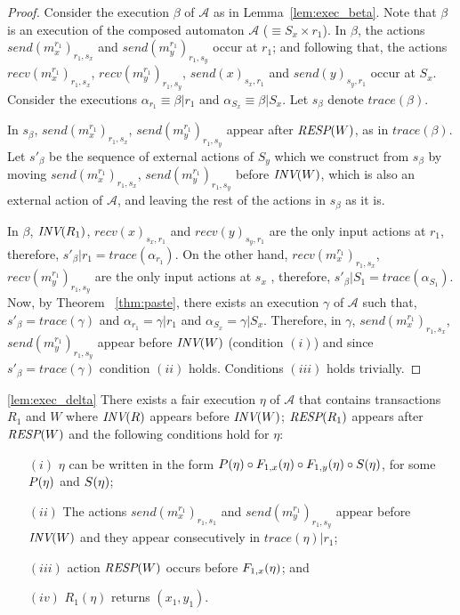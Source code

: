 \begin{proof}
Consider the execution $\beta$ of $\mathcal{A}$  as in Lemma~\ref{lem:exec_beta}. Note that $\beta$
is an execution of the composed automaton $\mathcal{A}$ ($\equiv S_x \times r_1$).  In $\beta$,  the actions 
 $send(m_x^{r_1})_{r_1, s_x}$ and   $send(m_y^{r_1})_{r_1, s_y}$ occur at $r_1$; and following that,  the actions 
 $recv(m_x^{r_1})_{r_1, s_x}$, $recv(m_y^{r_1})_{r_1, s_y}$, $send(x)_{s_x, r_1}$ and  $send(y)_{s_y, r_1}$ occur at $S_x$. 
 Consider the executions $\alpha_{r_1} \equiv \beta|r_1$ and  $\alpha_{S_x} \equiv \beta|S_x$. Let $s_{\beta}$ denote  $trace(\beta)$.
 
 In $s_{\beta}$, $send(m_x^{r_1})_{r_1, s_x}$,  $send(m_y^{r_1})_{r_1, s_y}$ appear after ${\textit{RESP}(W)}$, as in $trace(\beta)$. Let $s'_{\beta}$ be the sequence of
 external actions of $S_y$ which we construct from $s_{\beta}$ by moving $send(m_x^{r_1})_{r_1, s_x}$,  $send(m_y^{r_1})_{r_1, s_y}$ before ${\textit{INV}(W)}$, which  is also 
 an external action of $\mathcal{A}$, and leaving the rest of the actions in $s_{\beta}$ as it is.
 
 
 In $\beta$,  ${\textit{INV}(R_1)}$, $recv(x)_{ s_x, r_1}$ and  $recv(y)_{s_y, r_1}$ 
  are the only input actions at $r_1$, therefore,   $s'_{\beta} |r_1= trace(\alpha_{r_1})$. 
  On the other hand,  $recv(m_x^{r_1})_{r_1, s_x}$, $recv(m_y^{r_1})_{r_1, s_y}$ are the only input actions at $s_x$ ,
   therefore, $s'_{\beta} |S_1 = trace(\alpha_{S_1})$.  Now, by Theorem ~\ref{thm:paste}, there exists an execution 
 $\gamma$ of $\mathcal{A}$ such that, $s'_{\beta} = trace(\gamma)$ 
 and $\alpha_{r_1} = \gamma|r_1$ and $\alpha_{S_x} = \gamma|S_x$. Therefore, 
 in $\gamma$, $send(m_x^{r_1})_{r_1, s_x}$,  $send(m_y^{r_1})_{r_1, s_y}$ appear before
  ${\textit{INV}(W)}$ (condition $(i)$) and since $s'_{\beta} = trace(\gamma)$ condition $(ii)$  holds. Conditions $(iii)$ holds trivially.
\end{proof}


\begin{lemma*}\ref{lem:exec_delta} 
There exists a fair execution $\eta$ of $\mathcal{A}$ that contains transactions $R_1$ and $W$ where ${\textit{INV}(R)}$ appears before ${\textit{INV}(W)}$;  ${\textit{RESP}(R_1)}$ appears after  ${\textit{RESP}(W)}$ and the following conditions hold for $\eta$:
\begin{enumerate}
\item[ $(i)$] $\eta$ can be written in the form ${ P(\eta)}\circ { F_{1, x}(\eta)} \circ { F_{1, y}(\eta)} \circ { S(\eta)}$, for some 
   ${ P(\eta)}$ and ${ S(\eta)}$;
\item[$(ii)$] The actions $send(m_x^{r_1})_{r_1, s_1}$ and  $send(m_y^{r_1})_{r_1, s_y}$  appear before  ${\textit{INV}(W)}$ and they appear consecutively in $trace(\eta)|r_1$;
\item[$(iii)$] action ${\textit{RESP}(W)}$ occurs before ${ F_{1, x}(\eta)}$; and 
 \item[$(iv)$] $R_1(\eta)$ returns $(x_1, y_1)$. 
\end{enumerate} 
\end{lemma*}


